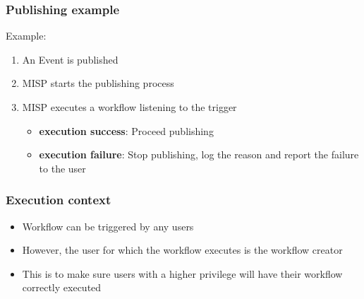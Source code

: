\begin{frame}
    \frametitle{Publishing example}
    Example:
    \begin{enumerate}
        \item An Event is published
        \item MISP starts the publishing process
        \item MISP executes a workflow listening to the trigger
        \begin{itemize}
            \item {\bf execution success}: Proceed publishing
            \item {\bf execution failure}: Stop publishing, log the reason and report the failure to the user
        \end{itemize}
    \end{enumerate}
\end{frame}

\begin{frame}
    \frametitle{Execution context}
    \begin{itemize}
        \item Workflow can be triggered by any users
        \item However, the user for which the workflow executes is the workflow creator
        \item This is to make sure users with a higher privilege will have their workflow correctly executed
    \end{itemize}
\end{frame}


